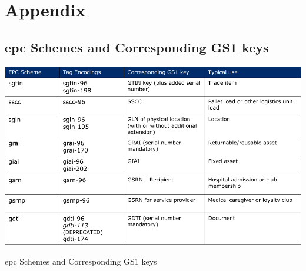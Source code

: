 \renewcommand{\thesection}{\Alph{section}}
\chapter{Appendix} 
\begin{appendices}
\section{\ac{epc} Schemes and Corresponding GS1 keys} \label{anx:epccodingschemes}
\begin{table}
    \centering
    \includegraphics[width=\textwidth]{./figs/02-state-of-the-art/epcschemes.pdf}
    \caption{\ac{epc} Schemes and Corresponding GS1 keys~\cite{EPCTagData}}
\end{table}


\end{appendices}
